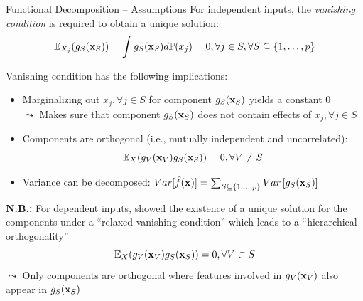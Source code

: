 \documentclass[11pt,compress,t,notes=noshow, aspectratio=169, xcolor=table]{beamer}
\begin{document}
\begin{frame}
\end{frame}

\begin{frame}{Functional Decomposition -- Assumptions}
For independent inputs, the \textit{vanishing condition} is required to obtain a unique solution:
$$\mathbb{E}_{X_j} (g_{S}(\xv_S)) = \int g_{S}(\xv_S) d \mathbb{P}(x_j) = 0, \forall j \in S, \forall S \subseteq \{1, \ldots, p\}$$

\pause 

Vanishing condition has the following implications:

\begin{itemize}
    \item Marginalizing out $x_j, \forall j \in S$ for component $g_S(\xv_S)$ yields a constant 0\\
    $\leadsto$ Makes sure that component $g_S(\xv_S)$ does not contain effects of $x_j, \forall j \in S$
    \item Components are orthogonal (i.e., mutually independent and uncorrelated):
    $$\mathbb{E}_{X} (g_{V}(\xv_V) g_{S}(\xv_S)) = 0, \forall V \neq S$$
    \item Variance can be decomposed:
$ Var[\fh(\xv)] =  \textstyle\sum_{S \subseteq \{1,\ldots,p\}}  Var\left[ g_{S}(\xv_S)\right]$
\end{itemize}

\pause 

\textbf{N.B.:} For dependent inputs,  showed the existence of a unique solution for the components under a ``relaxed vanishing condition'' which leads to a ``hierarchical orthogonality''
$$\mathbb{E}_{X} (g_{V}(\xv_V) g_{S}(\xv_S)) = 0, \forall V \subset S$$
$\leadsto$ Only components are orthogonal where features involved in $g_{V}(\xv_V)$ also appear in $g_{S}(\xv_S)$
\end{frame}
\end{document}

